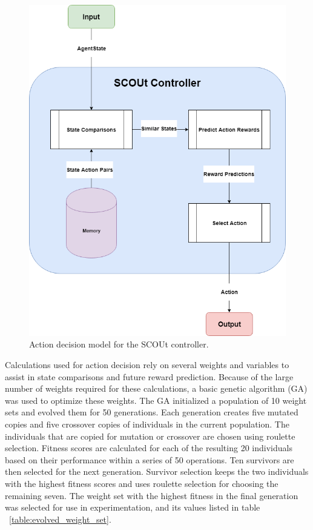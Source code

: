 \begin{figure}[H]
  \includegraphics[width=1.0\columnwidth]{Figures/SCOUt_action_decision_model.png}
  \caption{Action decision model for the SCOUt controller.}
  \label{fig:SCOUt_decision_model}
\end{figure}

Calculations used for action decision rely on several weights and variables to assist in state comparisons and future reward prediction.
Because of the large number of weights required for these calculations, a basic genetic algorithm (GA) was used to optimize these weights.
The GA initialized a population of 10 weight sets and evolved them for 50 generations.
Each generation creates five mutated copies and five crossover copies of individuals in the current population.
The individuals that are copied for mutation or crossover are chosen using roulette selection. 
Fitness scores are calculated for each of the resulting 20 individuals based on their performance within a series of 50 operations.
Ten survivors are then selected for the next generation.
Survivor selection keeps the two individuals with the highest fitness scores and uses roulette selection for choosing the remaining seven.
The weight set with the highest fitness in the final generation was selected for use in experimentation, and its values listed in table ~\ref{table:evolved_weight_set}.

